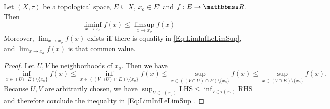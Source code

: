 \documentclass[screen,single]{techreport}
\numberwithin{equation}{section}
\begin{document}
\begin{theorem}\label{The:LimInfLeLimSup}
	Let $(X,\tau)$ be a topological space, $E \subseteq X$, $x_o \in E'$ and $f : E \to \bbR$.
	Then
	\begin{equation}
		\liminf_{x \to x_o} f(x) \le \limsup_{x \to x_o} f(x) \label{Eq:LimInfLeLimSup}
	\end{equation}
	Moreover, $\lim_{x \to x_o} f(x)$ exists iff there is equality in \eqref{Eq:LimInfLeLimSup}, and $\lim_{x \to x_o} f(x)$ is that common value.
\end{theorem}
\begin{proof}
  Let $U,V$ be neighborhoods of $x_o$.
  Then we have
  \[
  \inf_{x \in (U \cap E) \setminus \{ x_o\}} f(x) \le \inf_{x \in ((V\cap U) \cap E) \setminus \{x_o\}} f(x) \le \sup_{x \in ((V \cap U) \cap E) \setminus \{x_o\}} f(x) \le \sup_{x \in (V \cap E) \setminus \{x_o\}} f(x).
  \]
  Because $U,V$ are arbitrarily chosen, we have $\sup_{U \in \tau(x_o)} \mathrm{LHS} \le \inf_{V \in \tau(x_o)} \mathrm{RHS}$ and therefore conclude the inequality in \eqref{Eq:LimInfLeLimSup}.
  

\end{proof}
\end{document}
